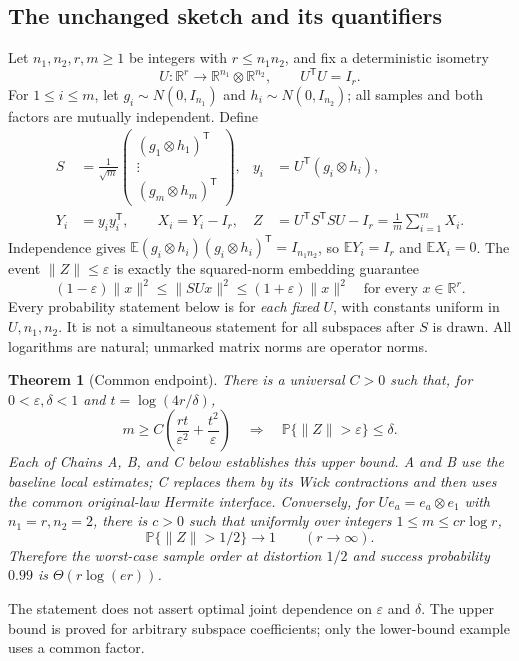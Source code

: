 \documentclass[11pt]{article}
\numberwithin{equation}{section}
\newtheorem{theorem}{Theorem}[section]
\theoremstyle{definition}\newtheorem{definition}[theorem]{Definition}
\theoremstyle{remark}\newtheorem{remark}[theorem]{Remark}
\newcommand{\R}{\mathbb R}\newcommand{\E}{\mathbb E}\newcommand{\Prob}{\mathbb P}
\newcommand{\norm}[1]{\lVert#1\rVert}\newcommand{\ip}[2]{\langle#1,#2\rangle}
\begin{document}
\subsection{The unchanged sketch and its quantifiers}
Let $n_1,n_2,r,m\ge1$ be integers with $r\le n_1n_2$, and fix a deterministic isometry
\[
 U:\R^r\longrightarrow\R^{n_1}\otimes\R^{n_2},\qquad U^{\mathsf T}U=I_r.
\]
For $1\le i\le m$, let $g_i\sim N(0,I_{n_1})$ and $h_i\sim N(0,I_{n_2})$;
all samples and both factors are mutually independent. Define
\begin{equation}\label{eq:model}
 \begin{aligned}
 S&=\frac1{\sqrt m}\begin{pmatrix}(g_1\otimes h_1)^{\mathsf T}\\\vdots\\(g_m\otimes h_m)^{\mathsf T}\end{pmatrix},
 &y_i&=U^{\mathsf T}(g_i\otimes h_i),\\
 Y_i&=y_iy_i^{\mathsf T},\qquad X_i=Y_i-I_r,
 &Z&=U^{\mathsf T}S^{\mathsf T}SU-I_r=\frac1m\sum_{i=1}^mX_i.
 \end{aligned}
\end{equation}
Independence gives $\E(g_i\otimes h_i)(g_i\otimes h_i)^{\mathsf T}=I_{n_1n_2}$,
so $\E Y_i=I_r$ and $\E X_i=0$.
The event $\norm Z\le\varepsilon$ is exactly the squared-norm embedding guarantee
\[
 (1-\varepsilon)\norm x^2\le\norm{SUx}^2\le(1+\varepsilon)\norm x^2
 \quad\text{for every }x\in\R^r.
\]
Every probability statement below is for \emph{each fixed} $U$, with constants uniform
in $U,n_1,n_2$. It is not a simultaneous statement for all subspaces after $S$ is drawn.
All logarithms are natural; unmarked matrix norms are operator norms.

\begin{theorem}[Common endpoint]\label{thm:common-endpoint}
There is a universal $C>0$ such that, for $0<\varepsilon,\delta<1$ and
$t=\log(4r/\delta)$,
\begin{equation}\label{eq:main-size}
 m\ge C\left(\frac{rt}{\varepsilon^2}+\frac{t^2}{\varepsilon}\right)
 \quad\Longrightarrow\quad\Prob\{\norm Z>\varepsilon\}\le\delta.
\end{equation}
Each of Chains A, B, and C below establishes this upper bound. A and B use the
baseline local estimates; C replaces them by its Wick contractions and then
uses the common original-law Hermite interface. Conversely, for $Ue_a=e_a\otimes e_1$ with $n_1=r,n_2=2$, there is
$c>0$ such that uniformly over integers $1\le m\le c r\log r$,
\[
 \Prob\{\norm Z>1/2\}\longrightarrow1\qquad(r\longrightarrow\infty).
\]
Therefore the worst-case sample order at distortion $1/2$ and success probability
$0.99$ is $\Theta(r\log(er))$.
\end{theorem}
The statement does not assert optimal joint dependence on $\varepsilon$ and $\delta$.
The upper bound is proved for arbitrary subspace coefficients; only the lower-bound
example uses a common factor.
\end{document}
